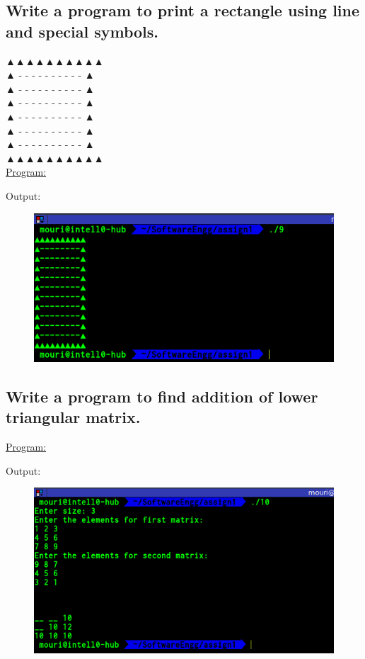 \documentclass[a4paper,11pt]{article}
\begin{document}
\subsection{Write a program to print a rectangle using line and special symbols.}
▲▲▲▲▲▲▲▲▲▲\\
▲ - - - - - - - - - - ▲\\
▲ - - - - - - - - - - ▲\\
▲ - - - - - - - - - - ▲\\
▲ - - - - - - - - - - ▲\\
▲ - - - - - - - - - - ▲\\
▲ - - - - - - - - - - ▲\\
▲▲▲▲▲▲▲▲▲▲\\
\underline{Program:}

Output:
\begin{figure}[H]
\centering
\includegraphics[width=350pt,height=\textheight,keepaspectratio]{./pics/C/9.png}
\end{figure}
\bigskip

\subsection{Write a program to find addition of lower triangular matrix.}
\underline{Program:}

Output:
\begin{figure}[H]
\centering
\includegraphics[width=350pt,height=\textheight,keepaspectratio]{./pics/C/10.png}
\end{figure}
\bigskip
\end{document}
